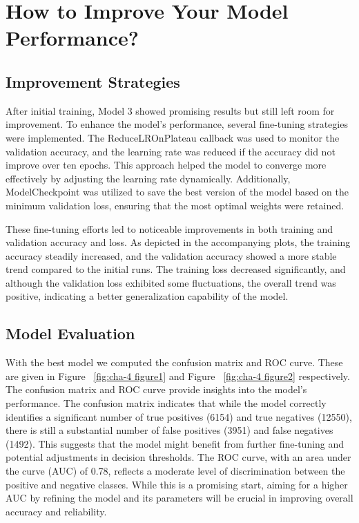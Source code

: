 \chapter{How to Improve Your Model Performance?}

\section{Improvement Strategies}
\label{sec:chap4 section 1}

After initial training, Model 3 showed promising results but still left room for improvement. To enhance the model's performance, several fine-tuning strategies were implemented. The ReduceLROnPlateau callback was used to monitor the validation accuracy, and the learning rate was reduced if the accuracy did not improve over ten epochs. This approach helped the model to converge more effectively by adjusting the learning rate dynamically. Additionally, ModelCheckpoint was utilized to save the best version of the model based on the minimum validation loss, ensuring that the most optimal weights were retained.

These fine-tuning efforts led to noticeable improvements in both training and validation accuracy and loss. As depicted in the accompanying plots, the training accuracy steadily increased, and the validation accuracy showed a more stable trend compared to the initial runs. The training loss decreased significantly, and although the validation loss exhibited some fluctuations, the overall trend was positive, indicating a better generalization capability of the model.

\section {Model Evaluation}
\label{sec:chap4 section 2}
With the best model we computed the confusion matrix and ROC curve. These are given in Figure ~\ref{fig:cha-4 figure1} and Figure ~\ref{fig:cha-4 figure2} respectively. The confusion matrix and ROC curve provide insights into the model's performance. The confusion matrix indicates that while the model correctly identifies a significant number of true positives (6154) and true negatives (12550), there is still a substantial number of false positives (3951) and false negatives (1492). This suggests that the model might benefit from further fine-tuning and potential adjustments in decision thresholds. The ROC curve, with an area under the curve (AUC) of 0.78, reflects a moderate level of discrimination between the positive and negative classes. While this is a promising start, aiming for a higher AUC by refining the model and its parameters will be crucial in improving overall accuracy and reliability.

